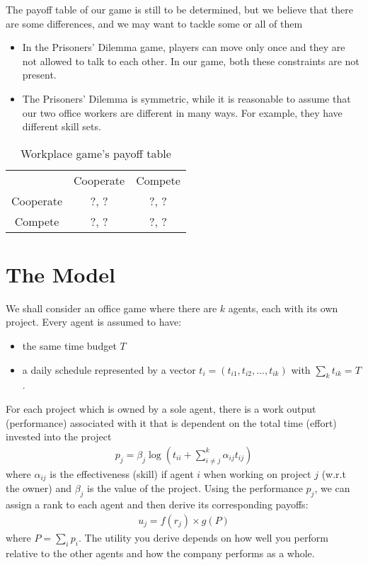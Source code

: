 \documentclass[11pt, a4paper]{article}
\begin{document}
The payoff table of our game is still to be determined, but we believe that there are some differences, and we may want to tackle some or all of them
\begin{itemize}
	\item In the Prisoners' Dilemma game, players can move only once and they are not allowed to talk to each other. In our game, both these constraints are not present.
	\item The Prisoners' Dilemma is symmetric, while it is reasonable to assume that our two office workers are different in many ways. For example, they have different skill sets.
\end{itemize}
\begin{table}[h]
	\centering
	\caption{Workplace game's payoff table}
	\begin{tabular}{c c c}
		          & Cooperate & Compete \\
		Cooperate & ?, ?      & ?, ?    \\
		 Compete  & ?, ?      & ?, ?
	\end{tabular}
\end{table}

\newpage

\section{The Model}
We shall consider an office game where there are $k$ agents, each with its own project. Every agent is assumed to have:
\begin{itemize}
\item the same time budget $T$
\item a daily schedule represented by a vector $t_i=(t_{i1},t_{i2},\ldots,t_{ik})$ with $\sum_{k}t_{ik}=T$.
\end{itemize}

For each project which is owned by a sole agent, there is a work output (performance) associated with it that is dependent on the total time (effort) invested into the project
\begin{align*}
p_j = \beta_j\log\left(t_{ii}+\sum_{i\neq j}^{k}\alpha_{ij}t_{ij}\right)
\end{align*}
where $\alpha_{ij}$ is the effectiveness (skill) if agent $i$ when working on project $j$ (w.r.t the owner) and $\beta_{j}$ is the value of the project. Using the performance $p_j$, we can assign a rank to each agent and then derive its corresponding payoffs:
\begin{align*}
u_j=f(r_j)\times g(P)
\end{align*}
where $P=\sum_{i}p_i$. The utility you derive depends on how well you perform relative to the other agents and how the company performs as a whole. 






\end{document}
